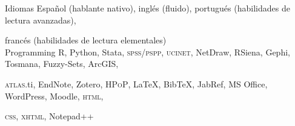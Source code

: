





\begin{cvskills}

\cvskill
{Idiomas} 
{Español (hablante nativo), inglés (fluido), portugués (habilidades de lectura avanzadas),} 

\cvskill
{} 
{francés (habilidades de lectura elementales)} \\

\cvskill
{Programming} 
{R, Python, Stata, {\scshape spss/pspp}, {\scshape ucinet}, NetDraw, RSiena, Gephi, Tosmana, Fuzzy-Sets, ArcGIS,}

\cvskill
{} 
{{\scshape atlas}.ti, EndNote, Zotero, {\scshape HPoP}, {\LaTeX}, Bib{\TeX}, JabRef, MS Office, WordPress, Moodle, {\scshape html},} 

\cvskill
{} 
{{\scshape css}, {\scshape xhtml}, Notepad{\footnotesize ++}} \\

\end{cvskills}
